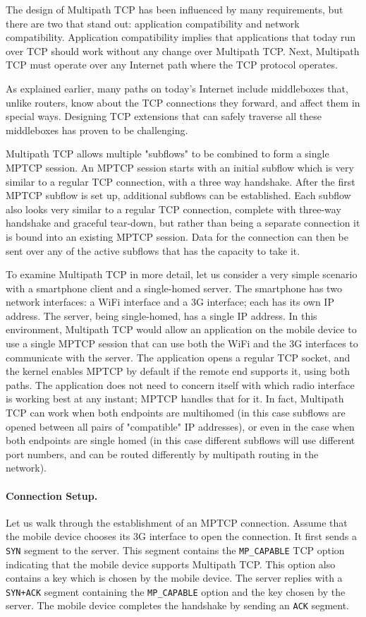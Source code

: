 The design of Multipath TCP has been influenced by many requirements,
but there are two that stand out: application compatibility and
network compatibility. Application compatibility implies that 
applications that today run over TCP should work without any change 
over Multipath TCP. Next, Multipath TCP must
operate over any Internet path where the TCP protocol operates.

As explained earlier, many paths on today's Internet include middleboxes that, unlike routers,
 know about the TCP connections they forward, and affect them in special ways. 
Designing TCP extensions that can safely traverse all these middleboxes has
proven to be challenging.

Multipath TCP allows multiple "subflows" to be combined to form a single MPTCP
session.  An MPTCP session starts with an initial subflow which is
very similar to a regular TCP connection, with a three way handshake.  After
the first MPTCP subflow is set up, additional subflows can be
established.  Each subflow also looks very similar to a
regular TCP connection, complete with three-way handshake and graceful tear-down,
but rather than being a separate connection it is bound into an
existing MPTCP session.  Data for the connection can
then be sent over any of the active subflows that has the capacity to
take it.

To examine Multipath TCP in more detail, let us consider a very simple
scenario with a smartphone client and a single-homed server. The
smartphone has two network interfaces: a WiFi interface and a 3G
interface; each has its own IP address.  The server, being
single-homed, has a single IP address. In this environment, Multipath
TCP would allow an application on the mobile device to use a single MPTCP
session that can use both the WiFi and the 3G interfaces to
communicate with the server.  The application opens a regular TCP socket, and
the kernel enables MPTCP by default if the remote end supports it, using both paths. 
The application does not need to concern itself with which radio interface is working best at any instant;
MPTCP handles that for it. In fact, Multipath TCP can work when
both endpoints are multihomed (in this case subflows are opened between
all pairs of "compatible" IP addresses), or even in the case when 
both endpoints are single homed (in this case different subflows will use
 different port numbers, and can be routed differently by multipath routing 
in the network). 

\paragraph{Connection Setup.} Let us walk through the establishment of an MPTCP connection. 
Assume that the mobile device chooses its 3G interface to open the
connection. It first sends a \texttt{SYN} segment to the server. This segment
contains the \texttt{MP\_CAPABLE} TCP option indicating that the mobile device
supports Multipath TCP. This option also contains a key which is
chosen by the mobile device. The server replies with a \texttt{SYN+ACK} segment
containing the \texttt{MP\_CAPABLE} option and the key chosen by the server. The
mobile device completes the handshake by sending an \texttt{ACK} segment.

